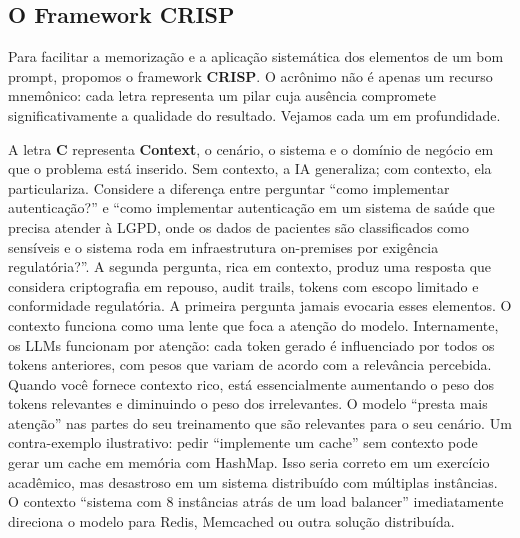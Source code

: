 \subsection{O Framework CRISP}

Para facilitar a memorização e a aplicação sistemática dos elementos de um bom
prompt, propomos o framework \textbf{CRISP}. O acrônimo não é apenas um recurso
mnemônico: cada letra representa um pilar cuja ausência compromete
significativamente a qualidade do resultado. Vejamos cada um em profundidade.

A letra \textbf{C} representa \textbf{Context}, o cenário, o sistema e o domínio
de negócio em que o problema está inserido. Sem contexto, a IA generaliza; com
contexto, ela particulariza. Considere a diferença entre perguntar ``como
implementar autenticação?'' e ``como implementar autenticação em um sistema de
saúde que precisa atender à LGPD, onde os dados de pacientes são classificados
como sensíveis e o sistema roda em infraestrutura on-premises por exigência
regulatória?''. A segunda pergunta, rica em contexto, produz uma resposta que
considera criptografia em repouso, audit trails, tokens com escopo limitado e
conformidade regulatória. A primeira pergunta jamais evocaria esses elementos.
O contexto funciona como uma lente que foca a atenção do modelo. Internamente,
os LLMs funcionam por atenção: cada token gerado é influenciado por todos os
tokens anteriores, com pesos que variam de acordo com a relevância percebida.
Quando você fornece contexto rico, está essencialmente aumentando o peso dos
tokens relevantes e diminuindo o peso dos irrelevantes. O modelo ``presta mais
atenção'' nas partes do seu treinamento que são relevantes para o seu cenário.
Um contra-exemplo ilustrativo: pedir ``implemente um cache'' sem contexto pode
gerar um cache em memória com HashMap. Isso seria correto em um exercício acadêmico, mas
desastroso em um sistema distribuído com múltiplas instâncias. O contexto
``sistema com 8 instâncias atrás de um load balancer'' imediatamente direciona o
modelo para Redis, Memcached ou outra solução distribuída.

